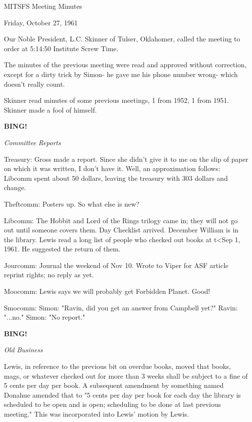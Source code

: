 \documentclass[12pt]{article}
\newcommand{\bing}{{\bf BING!} }
\newcommand{\goto}[1]{\bing \vskip 12pt \centerline{{\em{#1}}}}
\begin{document}
\begin{center}

MITSFS Meeting Minutes

Friday, October 27, 1961

\end{center}
 
\vspace{12pt}

\setlength{\parskip}{6pt}

\noindent
Our Noble President, L.C. Skinner of Tulser, Oklahomer, called the meeting to order at 5:14:50 Institute Screw Time.

The minutes of the previous meeting were read and approved without correction, except for a dirty trick by Simon- he gave me his phone number wrong- which doesn't really count.

Skinner read minutes of some previous meetings, 1 from 1952, 1 from 1951. Skinner made a fool of himself.

\goto{Committee Reports}

Treasury: Gross made a report. Since she didn't give it to me on the slip of paper on which it was written, I don't have it. Well, an approximation follows: Libcomm spent about 50 dollars, leaving the treasury with 303 dollars and change.

Theftcomm: Posters up. So what else is new?

Libcomm: The Hobbit and Lord of the Rings trilogy came in; they will not go out until someone covers them. Day Checklist arrived. December William is in the library. Lewis read a long list of people who checked out books at t<Sep 1, 1961. He suggested the return of them.

Jourcomm: Journal the weekend of Nov 10. Wrote to Viper for ASF article reprint rights; no reply as yet.

Moocomm: Lewis says we will probably get Forbidden Planet. Good!

Smocomm: Simon: "Ravin, did you get an answer from Campbell yet?" Ravin: "...no." Simon: "No report."

\goto{Old Business}

Lewis, in reference to the previous bit on overdue books, moved that books, mags, or whatever checked out for more than 3 weeks shall be subject to a fine of 5 cents per day per book. A subsequent amendment by something named Donahue amended that to "5 cents per day per book for each day the library is scheduled to be open and is open; scheduling to be done at last previous meeting." This was incorporated into Lewis' motion by Lewis.
\end{document}

